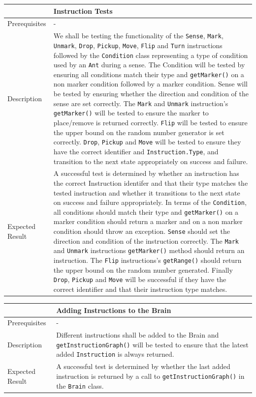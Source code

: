 \documentclass[11pt]{article}
\begin{document}
\begin{longtable}[c]{@{}p{}p{}@{}}
\toprule
& Instruction Tests \tabularnewline
\midrule
Prerequisites & - \tabularnewline
Description & We shall be testing the functionality of the \texttt{Sense}, \texttt{Mark}, \texttt{Unmark}, \texttt{Drop}, \texttt{Pickup}, \texttt{Move}, \texttt{Flip} and \texttt{Turn} instructions followed by the
\texttt{Condition} class representing a type of condition used by an \texttt{Ant} during a sense. The Condition will be tested by ensuring all conditions match their type and \texttt{getMarker()} on a non marker condition followed by a marker condition. Sense will be tested by ensuring whether the direction and condition of the sense are set correctly. The \texttt{Mark} and \texttt{Unmark} instruction's \texttt{getMarker()} will be tested to ensure the marker to place/remove is returned correctly. \texttt{Flip} will be tested to ensure the upper bound on the random number generator is set correctly. \texttt{Drop}, \texttt{Pickup} and \texttt{Move} will be tested to ensure they have the correct identifier and
\texttt{Instruction.Type}, and transition to the next state appropriately on success and failure. \tabularnewline
Expected Result & A successful test is determined by whether an
instruction has the correct Instruction identifer and that their type matches
the tested instruction and whether it transitions to the next state on
success and failure appropriately. In terms of the \texttt{Condition}, all
conditions should match their type and \texttt{getMarker()} on a marker condition
should return a marker and on a non marker condition should throw an
exception. \texttt{Sense} should set the direction and condition of the
instruction correctly. The \texttt{Mark} and \texttt{Unmark} instructions \texttt{getMarker()}
method should return an instruction. The \texttt{Flip} instructions's \texttt{getRange()}
should return the upper bound on the random number generated. Finally
\texttt{Drop}, \texttt{Pickup} and \texttt{Move} will be successful if they have the correct identifier
and that their instruction type matches. \tabularnewline
\bottomrule
\end{longtable}

\begin{longtable}[c]{@{}p{}p{}@{}}
\toprule
& Adding Instructions to the Brain \tabularnewline
\midrule
Prerequisites & - \tabularnewline
Description & Different instructions shall be added to the Brain and
\texttt{getInstructionGraph()} will be tested to ensure that the latest added \texttt{Instruction} is always returned. \tabularnewline
Expected Result & A successful test is determined by whether the last
added instruction is returned by a call to \texttt{getInstructionGraph()} in the \texttt{Brain} class. \tabularnewline
\bottomrule
\end{longtable}
\end{document}
